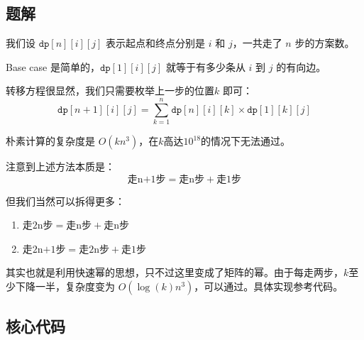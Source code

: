 \subsection*{题解}

我们设 $\texttt{dp}[n][i][j]$ 表示起点和终点分别是 $i$ 和 $j$，一共走了 $n$ 步的方案数。 

Base case 是简单的，$\texttt{dp}[1][i][j]$ 就等于有多少条从 $i$ 到 $j$ 的有向边。

转移方程很显然，我们只需要枚举上一步的位置$k$ 即可：
$$
\texttt{dp}[n+1][i][j] = \sum_{k = 1}^n \texttt{dp}[n][i][k] \times \texttt{dp}[1][k][j] 
$$

朴素计算的复杂度是 $O(kn^3)$，在$k$高达$10^{18}$的情况下无法通过。

注意到上述方法本质是：
$$
\text{走n+1步} = \text{走n步} + \text{走1步}
$$

但我们当然可以拆得更多：

\begin{enumerate}
    \item $\text{走2n步} = \text{走n步} + \text{走n步}$
    \item $\text{走2n+1步} = \text{走2n步} + \text{走1步}$
\end{enumerate}

其实也就是利用快速幂的思想，只不过这里变成了矩阵的幂。由于每走两步，$k$至少下降一半，复杂度变为 $O(\log(k)n^3)$，可以通过。具体实现参考代码。


\subsection*{核心代码}
\inputminted[linenos,autogobble]{cpp}{./Code/R.cpp}
\newpage